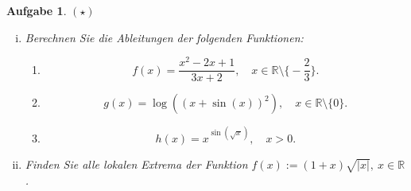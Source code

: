\documentclass[a4paper, 20]{exam}
\newtheorem{ex}{Aufgabe}
\newcommand\RR{\mathbb{R}}
\begin{document}
\begin{ex}{$(\star)$}
\begin{enumerate}[i.)]
\item
Berechnen Sie die Ableitungen der folgenden Funktionen:
\begin{enumerate}
\item
$$ f(x)= \frac{x^2-2x+1}{3x+2},  \quad x\in \RR \setminus \big\{ -\frac{2}{3} \big\} .$$
\item
$$ g(x) = \log((x + \sin(x))^2),  \quad x\in \RR \setminus \{ 0 \}.$$
\item
$$ h(x) = x^{\sin(\sqrt{x})}, \quad x>0.$$
\end{enumerate}
\item
Finden Sie alle lokalen Extrema der Funktion $f(x):=(1+x)\sqrt{\vert x \vert}, \ x\in \RR$.
\end{enumerate}
\end{ex}
\end{document}
